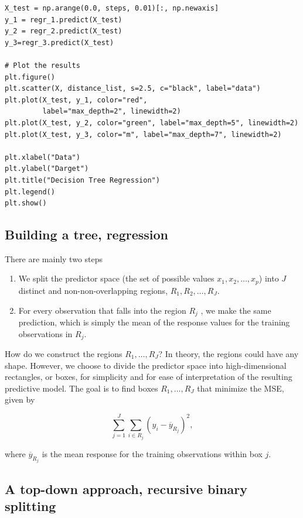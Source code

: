 \documentclass[%
oneside,                 %
final,                   %
10pt]{article}
\begin{document}
\begin{verbatim}
X_test = np.arange(0.0, steps, 0.01)[:, np.newaxis]
y_1 = regr_1.predict(X_test)
y_2 = regr_2.predict(X_test)
y_3=regr_3.predict(X_test)

# Plot the results
plt.figure()
plt.scatter(X, distance_list, s=2.5, c="black", label="data")
plt.plot(X_test, y_1, color="red",
         label="max_depth=2", linewidth=2)
plt.plot(X_test, y_2, color="green", label="max_depth=5", linewidth=2)
plt.plot(X_test, y_3, color="m", label="max_depth=7", linewidth=2)

plt.xlabel("Data")
plt.ylabel("Darget")
plt.title("Decision Tree Regression")
plt.legend()
plt.show()

\end{verbatim}



\subsection*{Building a tree, regression}

There are mainly two steps
\begin{enumerate}
\item We split the predictor space (the set of possible values $x_1,x_2,\dots, x_p$) into $J$ distinct and non-non-overlapping regions, $R_1,R_2,\dots,R_J$.  

\item For every observation that falls into the region $R_j$ , we make the same prediction, which is simply the mean of the response values for the training observations in $R_j$.
\end{enumerate}

\noindent
How do we construct the regions $R_1,\dots,R_J$?  In theory, the
regions could have any shape. However, we choose to divide the
predictor space into high-dimensional rectangles, or boxes, for
simplicity and for ease of interpretation of the resulting predictive
model. The goal is to find boxes $R_1,\dots,R_J$ that minimize the
MSE, given by

\[
\sum_{j=1}^J\sum_{i\in R_j}(y_i-\overline{y}_{R_j})^2,
\]

where $\overline{y}_{R_j}$  is the mean response for the training observations 
within box $j$. 

\subsection*{A top-down approach, recursive binary splitting}
\end{document}
